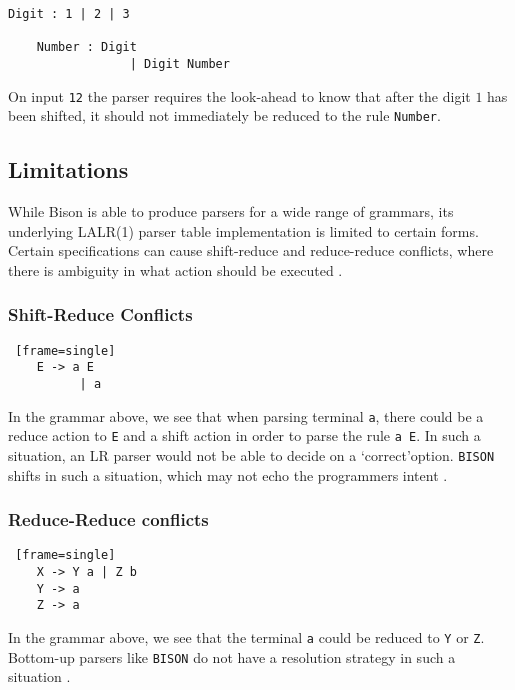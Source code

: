 \begin{Verbatim}[frame=single]
	Digit : 1 | 2 | 3

	Number : Digit 
                 | Digit Number
\end{Verbatim}

On input \verb|12| the parser requires the look-ahead to know that after the digit $1$ has been shifted, it should not immediately be reduced to the rule \verb|Number|.


\subsection{Limitations}

While Bison is able to produce parsers for a wide range of grammars, its underlying LALR(1) parser table implementation
is limited to certain forms. Certain specifications can cause shift-reduce and reduce-reduce conflicts, where there is ambiguity in
what action should be executed \cite{LRWiki}.

\subsubsection{Shift-Reduce Conflicts}

\begin{Verbatim} [frame=single]
    E -> a E
          | a
\end{Verbatim}

In the grammar above, we see that when parsing terminal \verb|a|, there could be a reduce action to \verb|E|
and a shift action in order to parse the rule \verb|a E|. In such a situation, an LR parser would not be able to decide on a \lq correct\rq option. \verb|BISON| shifts in such a situation, which may not echo the programmers intent \cite{BisonAlgorithm}.

\subsubsection{Reduce-Reduce conflicts}


\begin{Verbatim} [frame=single]
    X -> Y a | Z b
    Y -> a
    Z -> a
\end{Verbatim}

In the grammar above, we see that the terminal \verb|a| could be reduced to \verb|Y| or \verb|Z|. Bottom-up parsers like \verb|BISON| do not have a resolution strategy in such a situation \cite{DonnellyandStallman}.



